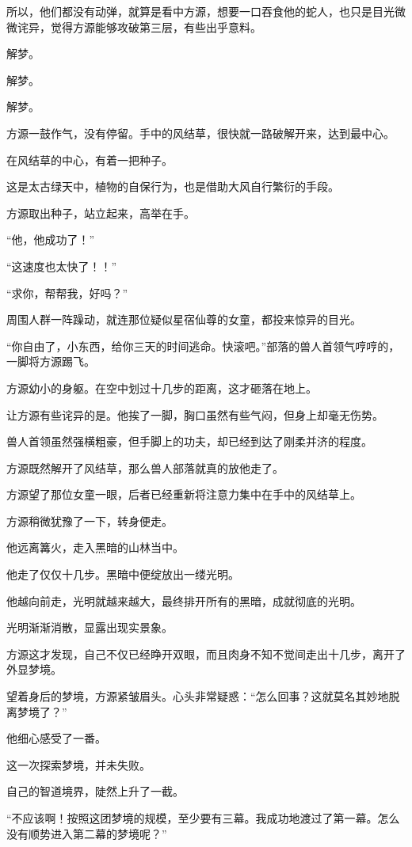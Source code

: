\begin{this_body}
所以，他们都没有动弹，就算是看中方源，想要一口吞食他的蛇人，也只是目光微微诧异，觉得方源能够攻破第三层，有些出乎意料。

解梦。

解梦。

解梦。

方源一鼓作气，没有停留。手中的风结草，很快就一路破解开来，达到最中心。

在风结草的中心，有着一把种子。

这是太古绿天中，植物的自保行为，也是借助大风自行繁衍的手段。

方源取出种子，站立起来，高举在手。

“他，他成功了！”

“这速度也太快了！！”

“求你，帮帮我，好吗？”

周围人群一阵躁动，就连那位疑似星宿仙尊的女童，都投来惊异的目光。

“你自由了，小东西，给你三天的时间逃命。快滚吧。”部落的兽人首领气哼哼的，一脚将方源踢飞。

方源幼小的身躯。在空中划过十几步的距离，这才砸落在地上。

让方源有些诧异的是。他挨了一脚，胸口虽然有些气闷，但身上却毫无伤势。

兽人首领虽然强横粗豪，但手脚上的功夫，却已经到达了刚柔并济的程度。

方源既然解开了风结草，那么兽人部落就真的放他走了。

方源望了那位女童一眼，后者已经重新将注意力集中在手中的风结草上。

方源稍微犹豫了一下，转身便走。

他远离篝火，走入黑暗的山林当中。

他走了仅仅十几步。黑暗中便绽放出一缕光明。

他越向前走，光明就越来越大，最终排开所有的黑暗，成就彻底的光明。

光明渐渐消散，显露出现实景象。

方源这才发现，自己不仅已经睁开双眼，而且肉身不知不觉间走出十几步，离开了外显梦境。

望着身后的梦境，方源紧皱眉头。心头非常疑惑：“怎么回事？这就莫名其妙地脱离梦境了？”

他细心感受了一番。

这一次探索梦境，并未失败。

自己的智道境界，陡然上升了一截。

“不应该啊！按照这团梦境的规模，至少要有三幕。我成功地渡过了第一幕。怎么没有顺势进入第二幕的梦境呢？”


\end{this_body}
